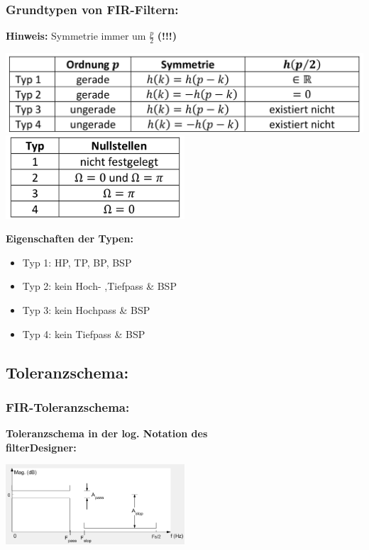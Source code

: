 \documentclass[10pt,a4paper]{article}
\begin{document}
\begin{minipage}{0.5\textwidth} 
\subsubsection{Grundtypen von FIR-Filtern:}
\textbf{Hinweis: } Symmetrie immer um $\frac{p}{2}$ \textbf{(!!!)}
\begin{center}
      \includegraphics[width=1\textwidth]{./img/Grundtypen_FIR.png}
      \includegraphics[width=0.5\textwidth]{./img/Grundtypen_FIR_NST.png}
\end{center}
\textbf{Eigenschaften der Typen:}
\begin{itemize}
	\item Typ 1: HP, TP, BP, BSP
	\item Typ 2: kein Hoch- ,Tiefpass \& BSP
	\item Typ 3: kein Hochpass \& BSP
	\item Typ 4: kein Tiefpass \& BSP
\end{itemize}
\end{minipage}
\subsection{Toleranzschema:}
\subsubsection{FIR-Toleranzschema:}

\textbf{Toleranzschema in der log. Notation des \\ \grqq{}filterDesigner\grqq{}: }
  \begin{center}
      \includegraphics[width=0.5\textwidth]{./img/toleranzschema1.png}
  \end{center}
\end{document}
